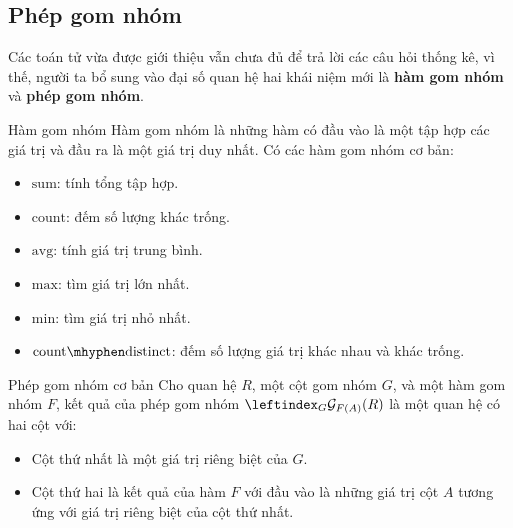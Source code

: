 \documentclass[11pt, handout]{beamer}
\begin{document}
  \subsection{Phép gom nhóm}
  \begin{frame}
    Các toán tử vừa được giới thiệu vẫn chưa đủ để trả lời các câu hỏi thống kê, 
    vì thế, người ta bổ sung vào đại số quan hệ hai khái niệm mới là 
    \textbf{hàm gom nhóm} và \textbf{phép gom nhóm}.
  \end{frame}
  \begin{frame}{Hàm gom nhóm}
    Hàm gom nhóm là những hàm có đầu vào là một tập hợp các giá trị và đầu ra là một giá trị duy nhất.
    Có các hàm gom nhóm cơ bản:
    \begin{itemize}
      \item $\mathrm{sum}$: tính tổng tập hợp.
      \item $\mathrm{count}$: đếm số lượng khác trống.
      \item $\mathrm{avg}$: tính giá trị trung bình.
      \item $\mathrm{max}$: tìm giá trị lớn nhất.
      \item $\mathrm{min}$: tìm giá trị nhỏ nhất.
      \item $\mathrm{count\mhyphen distinct}$: đếm số lượng giá trị khác nhau và khác trống.
    \end{itemize}
  \end{frame}
  \begin{frame}{Phép gom nhóm cơ bản}
    Cho quan hệ $R$, một cột gom nhóm $G$, và một hàm gom nhóm $F$, 
    kết quả của phép gom nhóm $\leftindex_{G}{\mathcal{G}}_{F(A)}(R)$ 
    là một quan hệ có hai cột với:
    \begin{itemize}
      \item Cột thứ nhất là một giá trị riêng biệt của $G$.
      \item Cột thứ hai là kết quả của hàm $F$ với đầu vào là những giá trị cột $A$ 
      tương ứng với giá trị riêng biệt của cột thứ nhất.
    \end{itemize}
  \end{frame}
\end{document}
